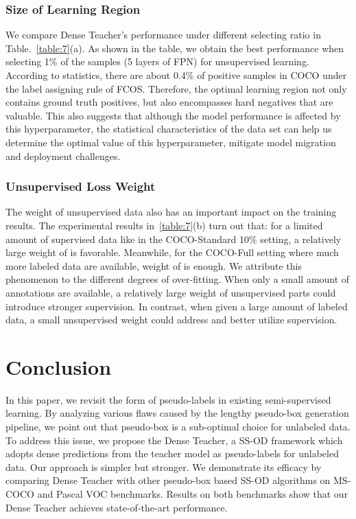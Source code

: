 \documentclass[runningheads]{llncs}
\begin{document}
\subsubsection{Size of Learning Region}
We compare Dense Teacher's performance under different selecting ratio  in Table.~\ref{table:7}(a). As shown in the table, we obtain the best performance when selecting 1\% of the samples (5 layers of FPN) for unsupervised learning. According to statistics, there are about 0.4\% of positive samples in COCO under the label assigning rule of FCOS. Therefore, the optimal learning region not only contains ground truth positives, but also encompasses hard negatives that are valuable. This also suggests that although the model performance is affected by this hyperparameter, the statistical characteristics of the data set can help us determine the optimal value of this hyperparameter, mitigate model migration and deployment challenges.

\subsubsection{Unsupervised Loss Weight}
The weight of unsupervised data also has an important impact on the training results. The experimental results in~\ref{table:7}(b) turn out that: for a limited amount of supervised data like in the COCO-Standard 10\% setting, a relatively large weight of  is favorable. Meanwhile, for the COCO-Full setting where much more labeled data are available, weight of  is enough. We attribute this phenomenon to the different degrees of over-fitting. When only a small amount of annotations are available, a relatively large weight of unsupervised parts could introduce stronger supervision. In contrast, when given a large amount of labeled data, a small unsupervised weight could address and better utilize supervision.

\section{Conclusion}

In this paper, we revisit the form of pseudo-labels in existing semi-supervised learning. By analyzing various flaws caused by the lengthy pseudo-box generation pipeline, we point out that pseudo-box is a sub-optimal choice for unlabeled data. To address this issue, we propose the Dense Teacher, a SS-OD framework which adopts dense predictions from the teacher model as pseudo-labels for unlabeled data. Our approach is simpler but stronger. We demonstrate its efficacy by comparing Dense Teacher with other pseudo-box based SS-OD algorithms on MS-COCO and Pascal VOC benchmarks. Results on both benchmarks show that our Dense Teacher achieves state-of-the-art performance.

\clearpage


\end{document}
